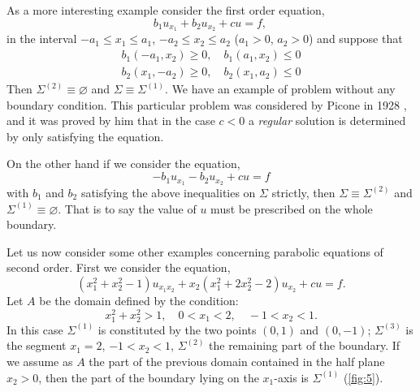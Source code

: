 \documentclass[a4paper,12pt,leqno]{article}
\numberwithin{equation}{section}
\begin{document}
As a more interesting example consider the first order equation,
\begin{equation*}
	b_{1} u_{x_{1}}+b_{2} u_{x_{2}}+c u=f \text {, }
\end{equation*}
in the interval $-a_{1} \leq x_{1} \leq a_{1}$, $-a_{2} \leq x_{2} \leq a_{2}$ ($a_{1}>0$, $a_{2}>0$) and suppose that
\begin{equation*}
	\begin{aligned}
		b_{1}\left(-a_{1}, x_{2}\right) \geq 0,
		\quad 
		b_{1}\left(a_{1}, x_{2}\right) \leq 0 \\
		b_{2}\left(x_{1},-a_{2}\right) \geq 0,
		\quad
		b_{2}\left(x_{1}, a_{2}\right) \leq 0
	\end{aligned}
\end{equation*}
Then $\Sigma^{(2)} \equiv \varnothing$ and $\Sigma \equiv \Sigma^{(1)}$. 
We have an example of problem without any boundary condition. 
This particular problem was considered by Picone in 1928 \cite{14}, and it was proved by him that in the case $c<0$ a \emph{regular} solution is determined by only satisfying the equation. 

On the other hand if we consider the equation,
\begin{equation*}
	-b_{1} u_{x_{1}}-b_{2} u_{x_{2}}+c u=f
\end{equation*}
with $b_1$ and $b_2$ satisfying the above inequalities on $\Sigma$ strictly, then $\Sigma \equiv \Sigma^{(2)}$ and $\Sigma^{(1)} \equiv \varnothing$. 
That is to say the value of $u$ must be prescribed on the whole boundary.

Let us now consider some other examples concerning parabolic equations of second order. First we consider the equation, \begin{equation*} 
	\left(x_{1}^{2}+x_{2}^{2}-1\right) u_{x_{1} x_{2}}+x_{2}\left(x_{1}^{2}+2 x_{2}^{2}-2\right) u_{x_{2}}+c u=f.
\end{equation*} 
Let $A$ be the domain defined by the condition:
\begin{equation*}
	x_1^2+x_2^2>1, \quad 0 < x_1 < 2, \quad -1 < x_2 < 1.
\end{equation*}
In this case $\Sigma^{(1)}$ is constituted by the two points $(0,1)$ and $(0,-1)$; $\Sigma^{(3)}$ is the segment $x_1 = 2$, $-1<x_2<1$, $\Sigma^{(2)}$ the remaining part of the boundary.
If we assume as $A$ the part of the previous domain contained in the half plane $x_2 > 0$, then the part of the boundary lying on the $x_1$-axis is $\Sigma^{(1)}$ (\cref{fig:5}).
\end{document}
